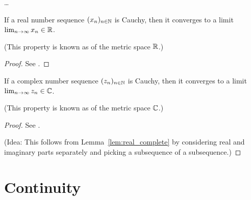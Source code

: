 \begin{definition}
  \label{def:cauchy_sequence}
  \ldots
\end{definition}

\begin{lemma}
  \label{lem:real_complete}
  If a real number sequence $(x_n)_{n \in \mathbb{N}}$ is Cauchy,
  then it converges to a limit $\lim_{n \to \infty} x_n \in \mathbb{R}$.

  (This property is known as  of the metric space $\mathbb{R}$.)
\end{lemma}
\begin{proof}
  See \MetSpCourse{}.
\end{proof}

\begin{lemma}
  \label{lem:complex_complete}
  If a complex number sequence $(z_n)_{n \in \mathbb{N}}$ is Cauchy,
  then it converges to a limit $\lim_{n \to \infty} z_n \in \mathbb{C}$.

  (This property is known as  of the metric space $\mathbb{C}$.)
\end{lemma}
\begin{proof}
  See \MetSpCourse{}.

  (Idea: This follows from Lemma~\ref{lem:real_complete} by
  considering real and imaginary parts separately and picking
  a subsequence of a subsequence.)
\end{proof}



\section{Continuity}

